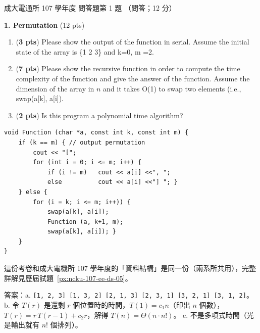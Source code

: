 \begin{pastexam}[label={px:ncku-107-cce-05}]{成大電通所 107 學年度 問答題第 1 題}
（問答；12 分）

\textbf{1. Permutation} (12 pts)
\begin{enumerate}[label=\alph*.]
\item (\textbf{3 pts}) Please show the output of the function in serial. Assume the initial state of the
array is \{1 2 3\} and k=0, m =2.
\item (\textbf{7 pts}) Please show the recursive function in order to compute the time complexity of the
function and give the answer of the function. Assume the dimension of the array in $n$ and it takes
O(1) to swap two elements (i.e., swap(a[k], a[i]).
\item (\textbf{2 pts}) Is this program a polynomial time algorithm?
\end{enumerate}
\begin{verbatim}
void Function (char *a, const int k, const int m) {
    if (k == m) { // output permutation
        cout << "[";
        for (int i = 0; i <= m; i++) {
            if (i != m)   cout << a[i] <<", ";
            else          cout << a[i] <<"] "; }
    } else {
        for (i = k; i <= m; i++)) {
            swap(a[k], a[i]);
            Function (a, k+1, m);
            swap(a[k], a[i]); }
    }
}
\end{verbatim}
\end{pastexam}

\begin{pastsoln}
這份考卷和成大電機所 107 學年度的「資料結構」是同一份（兩系所共用），完整詳解見歷屆試題~\ref{px:ncku-107-ee-ds-05}。

答案：a. \texttt{[1, 2, 3] [1, 3, 2] [2, 1, 3] [2, 3, 1] [3, 2, 1] [3, 1, 2]}。
b. 令 $T(r)$ 是還剩 $r$ 個位置時的時間，$T(1) = c_1 n$（印出 $n$ 個數），$T(r) = r\,T(r-1) + c_2 r$，解得
$T(n) = \Theta(n \cdot n!)$。 c. 不是多項式時間（光是輸出就有 $n!$ 個排列）。
\end{pastsoln}
